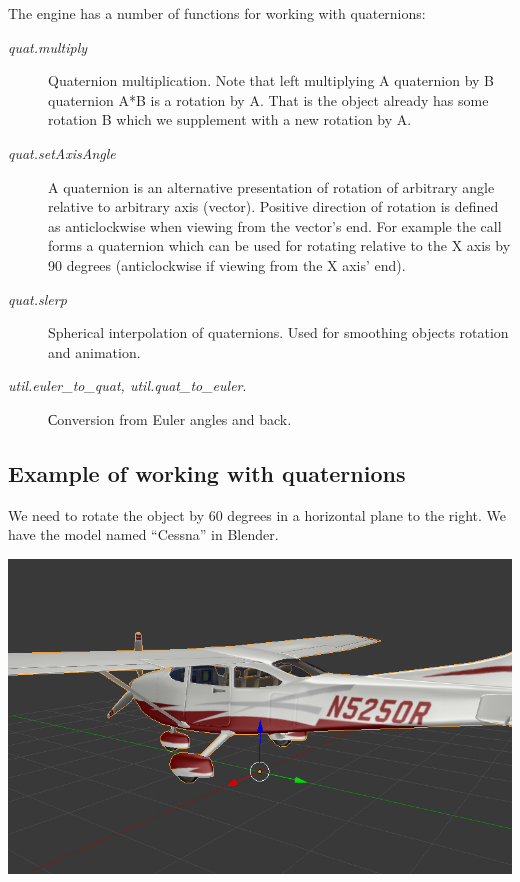 \documentclass[a4paper,12pt,oneside]{sphinxmanual}
\begin{document}
The engine has a number of functions for working with quaternions:
\begin{description}
\item[{\emph{quat.multiply}}] \leavevmode
Quaternion multiplication. Note that left multiplying A quaternion by B quaternion A*B is a rotation by A. That is the object already has some rotation B which we supplement with a new rotation by A.

\item[{\emph{quat.setAxisAngle}}] \leavevmode
A quaternion is an alternative presentation of rotation of arbitrary angle relative to arbitrary axis (vector). Positive direction of rotation is defined as anticlockwise when viewing from the vector's end. For example the  call forms a quaternion which can be used for rotating relative to the X axis by 90 degrees (anticlockwise if viewing from the X axis' end).

\item[{\emph{quat.slerp}}] \leavevmode
Spherical interpolation of quaternions. Used for smoothing objects rotation and animation.

\item[{\emph{util.euler\_to\_quat, util.quat\_to\_euler}.}] \leavevmode
Сonversion from Euler angles and back.

\end{description}


\subsection{Example of working with quaternions}
\label{developers:id7}
We need to rotate the object by 60 degrees in a horizontal plane to the right. We have the model named ``Cessna'' in Blender.

{\hfill\includegraphics[width=1.000\linewidth]{aircraft.jpg}\hfill}
\end{document}
